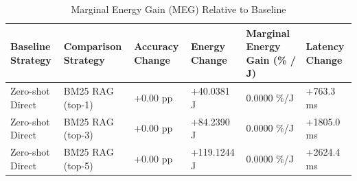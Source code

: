 \begin{table}
\caption{Marginal Energy Gain (MEG) Relative to Baseline}
\label{tab:marginal_energy_gain}
\begin{tabular}{llllll}
\toprule
Baseline Strategy & Comparison Strategy & Accuracy Change & Energy Change & Marginal Energy Gain (\% / J) & Latency Change \\
\midrule
Zero-shot Direct & BM25 RAG (top-1) & +0.00 pp & +40.0381 J & 0.0000 \%/J & +763.3 ms \\
Zero-shot Direct & BM25 RAG (top-3) & +0.00 pp & +84.2390 J & 0.0000 \%/J & +1805.0 ms \\
Zero-shot Direct & BM25 RAG (top-5) & +0.00 pp & +119.1244 J & 0.0000 \%/J & +2624.4 ms \\
\bottomrule
\end{tabular}
\end{table}
